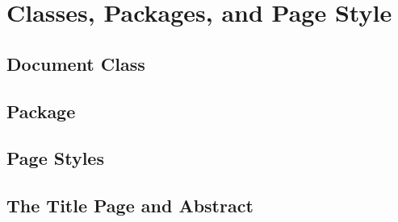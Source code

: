 \section{Classes, Packages, and Page Style}
\subsection{Document Class}


\subsection{Package}


\subsection{Page Styles}


\subsection{The Title Page and Abstract}